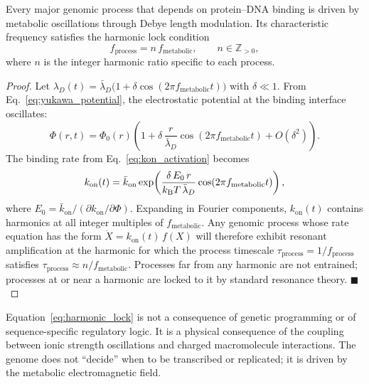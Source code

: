 \begin{theorem}
\label{thm:metabolic_genomic_coupling}
Every major genomic process that depends on protein--DNA binding is
driven by metabolic oscillations through Debye length modulation. Its
characteristic frequency satisfies the harmonic lock condition
\begin{equation}
  f_{\mathrm{process}} = n\, f_{\mathrm{metabolic}},
  \qquad n \in \mathbb{Z}_{>0},
  \label{eq:harmonic_lock}
\end{equation}
where $n$ is the integer harmonic ratio specific to each process.
\end{theorem}

\begin{proof}
Let $\lambda_D(t) = \bar\lambda_D\bigl(1 + \delta\cos(2\pi f_{\mathrm{metabolic}} t)\bigr)$
with $\delta \ll 1$. From Eq.~\eqref{eq:yukawa_potential}, the electrostatic
potential at the binding interface oscillates:
\begin{equation}
  \Phi(r,t) = \Phi_0(r)\left(1 + \delta\,\frac{r}{\bar\lambda_D}\cos(2\pi f_{\mathrm{metabolic}}t) + O(\delta^2)\right).
\end{equation}
The binding rate from Eq.~\eqref{eq:kon_activation} becomes
\begin{equation}
  k_{\mathrm{on}}(t) = \bar{k}_{\mathrm{on}}
  \exp\!\left(\frac{\delta\,E_0\,r}{k_{\mathrm{B}} T\,\bar\lambda_D}\cos(2\pi f_{\mathrm{metabolic}}t)\right),
\end{equation}
where $E_0 = \bar{k}_{\mathrm{on}}/(\partial k_{\mathrm{on}}/\partial\Phi)$.
Expanding in Fourier components, $k_{\mathrm{on}}(t)$ contains harmonics at
all integer multiples of $f_{\mathrm{metabolic}}$. Any genomic process whose
rate equation has the form $\dot{X} = k_{\mathrm{on}}(t)\,f(X)$ will therefore
exhibit resonant amplification at the harmonic for which the process timescale
$\tau_{\mathrm{process}} = 1/f_{\mathrm{process}}$ satisfies
$\tau_{\mathrm{process}} \approx n/f_{\mathrm{metabolic}}$. Processes far from
any harmonic are not entrained; processes at or near a harmonic are locked to it
by standard resonance theory. $\blacksquare$
\end{proof}

\begin{remark}
Equation~\eqref{eq:harmonic_lock} is not a consequence of genetic programming
or of sequence-specific regulatory logic. It is a physical consequence of the
coupling between ionic strength oscillations and charged macromolecule
interactions. The genome does not ``decide'' when to be transcribed or
replicated; it is driven by the metabolic electromagnetic field.
\end{remark}


